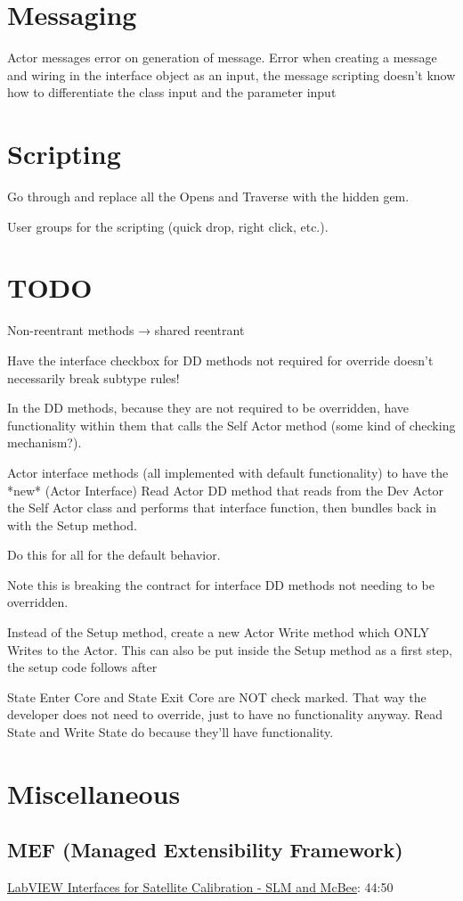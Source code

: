 \documentclass{article}
\begin{document}
\section{Messaging}
\label{sec:messaging}

Actor messages error on generation of message.
Error when creating a message and wiring in the interface object as an input, the message scripting doesn't know how to differentiate the class input and the parameter input


\section{Scripting}
\label{sec:scripting}

Go through and replace all the Opens and Traverse with the hidden gem.

User groups for the scripting (quick drop, right click, etc.).


\section{TODO}
\label{sec:todo}

Non-reentrant methods → shared reentrant

Have the interface checkbox for DD methods not required for override doesn't necessarily break subtype rules!

In the DD methods, because they are not required to be overridden, have functionality within them that calls the Self Actor method (some kind of checking mechanism?).

Actor interface methods (all implemented with default functionality) to have the *new* (Actor Interface) Read Actor DD method that reads from the Dev Actor the Self Actor class and performs that interface function, then bundles back in with the Setup method.

Do this for all for the default behavior.

Note this is breaking the contract for interface DD methods not needing to be overridden.

Instead of the Setup method, create a new Actor Write method which ONLY Writes to the Actor. This can also be put inside the Setup method as a first step, the setup code follows after

State Enter Core and State Exit Core are NOT check marked.
That way the developer does not need to override, just to have no functionality anyway.
Read State and Write State do because they'll have functionality.

\section{Miscellaneous}
\label{sec:miscellaneous}

\subsection{MEF (Managed Extensibility Framework)}
\label{subsec:mef}

\href{https://www.youtube.com/watch?v=rrtz7sKCg2A}{LabVIEW Interfaces for Satellite Calibration - SLM and McBee}: 44:50
\end{document}
